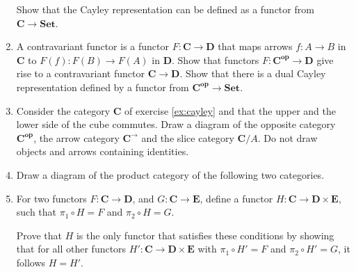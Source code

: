 \documentclass{scrartcl}
\newcommand{\RoNu}[1]{\textup{\uppercase\expandafter{\romannumeral#1}}}
\newcommand{\Cat}[1]{\mathbf{#1}}
\newcommand{\Op}[1]{#1^{\mathbf{op}}}
\newcommand{\Arr}[1]{#1^{\rightarrow}}
\begin{document}
\begin{enumerate}
  Show that the Cayley representation can be defined as a functor from $\Cat{C} \rightarrow \Cat{Set}$.

\item
  A contravariant functor is a functor $F: \Cat{C} \rightarrow \Cat{D}$ that maps arrows $f: A \rightarrow B$ in $\Cat{C}$ to $F(f): F(B) \rightarrow F(A)$ in $\Cat{D}$.
  Show that functors $F: \Op{\Cat{C}} \rightarrow \Cat{D}$ give rise to a contravariant functor $\Cat{C} \rightarrow \Cat{D}$.
  Show that there is a dual Cayley representation defined by a functor from $\Op{\Cat{C}} \rightarrow \Cat{Set}$.

\item
  Consider the category $\Cat{C}$ of exercise \ref{ex:cayley} and that the upper and the lower side of the cube commutes. Draw a diagram of the opposite category $\Op{\Cat{C}}$, the arrow category $\Arr{\Cat{C}}$ and the slice category $\Cat{C}/A$. Do not draw objects and arrows containing identities.

\item
  Draw a diagram of the product category of the following two categories.
  \begin{center}
  \end{center}

\item
  For two functors $F: \mathbf{C} \rightarrow \mathbf{D}$, and $G: \mathbf{C} \rightarrow \mathbf{E}$, define a functor $H: \mathbf{C} \rightarrow \mathbf{D} \times \mathbf{E}$, such that $\pi_1 \circ H = F$ and $\pi_2 \circ H = G$.
  \begin{center}
  \end{center}
  Prove that $H$ is the only functor that satisfies these conditions by showing that for all other functors $H': \mathbf{C} \rightarrow \mathbf{D} \times \mathbf{E}$ with $\pi_1 \circ H' = F$ and $\pi_2 \circ H' = G$, it follows $H = H'$.


\end{enumerate}
\end{document}
